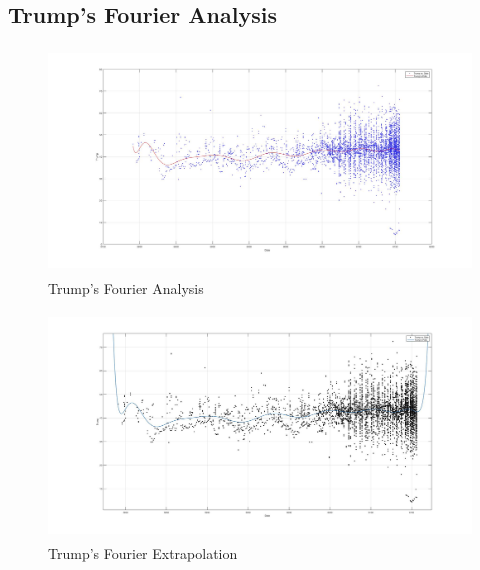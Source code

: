 \documentclass[twoside]{article}
\begin{document}
              \newpage
              \subsection{Trump's Fourier Analysis}
              \begin{figure}[H]
                \centering
                \includegraphics[width=\textwidth,height=6cm]{images/fourier/trump.jpg}
                \caption{Trump's Fourier Analysis}
              \end{figure}
              \begin{figure}[H]
                \centering
                \includegraphics[width=\textwidth,height=6cm]{images/fourier/trumplarge.jpg}
                \caption{Trump's Fourier Extrapolation}
              \end{figure}
\end{document}
